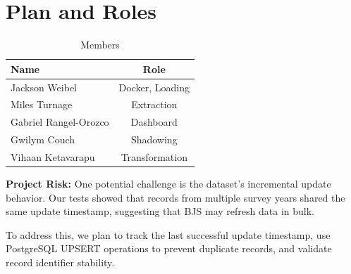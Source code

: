 \documentclass{article}
\begin{document}
\section{Plan and Roles}
\begin{table}[htbp]
  \centering
  \caption{Members}
  \label{tab:team_table}
  \begin{tabular}{| l | c |}
    \hline
    \textbf{Name} & \textbf{Role} \\ \hline
    Jackson Weibel            &  Docker, Loading                \\ \hline
    Miles Turnage         &  Extraction                    \\ \hline
    Gabriel Rangel-Orozco         &     Dashboard                \\ \hline
    Gwilym Couch         &            Shadowing          \\ \hline
    Vihaan Ketavarapu         &        Transformation             \\ \hline
  \end{tabular}
\end{table}

\noindent
\textbf{Project Risk:}
One potential challenge is the dataset's incremental
update behavior. Our tests showed that records from
multiple survey years shared the same update timestamp,
suggesting that BJS may refresh data in bulk.

To address this, we plan to track the last successful
update timestamp, use PostgreSQL UPSERT operations
to prevent duplicate records, and validate record
identifier stability.
\end{document}
